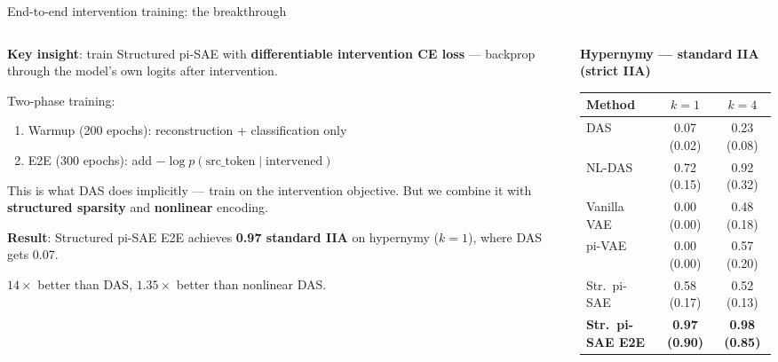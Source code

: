 \documentclass[aspectratio=169,11pt]{beamer}
\begin{document}
\begin{frame}{End-to-end intervention training: the breakthrough}

\begin{columns}[T]
\begin{column}{0.48\textwidth}
{\small \textbf{Key insight}: train Structured pi-SAE with \textbf{differentiable intervention CE loss} --- backprop through the model's own logits after intervention.}

\vspace{0.3em}
{\small Two-phase training:}
\begin{enumerate}
  \item {\small Warmup (200 epochs): reconstruction + classification only}
  \item {\small E2E (300 epochs): add $-\log p(\text{src\_token} \mid \text{intervened})$}
\end{enumerate}

\vspace{0.3em}
{\small This is what DAS does implicitly --- train on the intervention objective. But we combine it with \textbf{structured sparsity} and \textbf{nonlinear} encoding.}

\vspace{0.5em}
{\small \textbf{Result}: Structured pi-SAE E2E achieves \textbf{0.97 standard IIA} on hypernymy ($k{=}1$), where DAS gets 0.07.}

\vspace{0.3em}
{\small $14\times$ better than DAS, $1.35\times$ better than nonlinear DAS.}
\end{column}
\begin{column}{0.50\textwidth}
{\scriptsize\centering
\renewcommand{\arraystretch}{1.15}
\textbf{Hypernymy --- standard IIA (strict IIA)}\\[0.3em]
\begin{tabular}{l|cc}
\toprule
\textbf{Method} & \textbf{$k = 1$} & \textbf{$k = 4$} \\
\midrule
DAS              & 0.07 (0.02) & 0.23 (0.08) \\
NL-DAS           & 0.72 (0.15) & 0.92 (0.32) \\
\midrule
Vanilla VAE      & 0.00 (0.00) & 0.48 (0.18) \\
pi-VAE           & 0.00 (0.00) & 0.57 (0.20) \\
Str.\ pi-SAE     & 0.58 (0.17) & 0.52 (0.13) \\
\midrule
\textbf{Str.\ pi-SAE E2E} & \textbf{0.97 (0.90)} & \textbf{0.98 (0.85)} \\
\bottomrule
\end{tabular}
}


\end{column}
\end{columns}
\end{frame}
\end{document}

